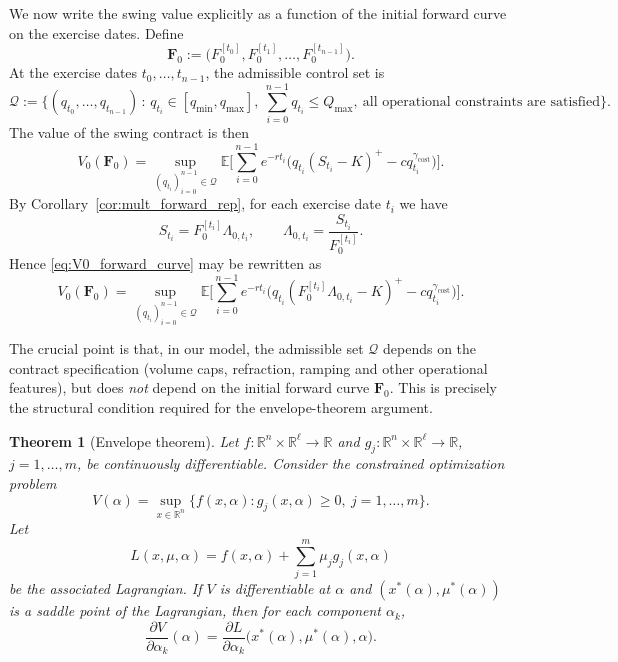 \documentclass[10pt,a4paper,reqno]{amsart}
\newcommand{\<}{\langle}
\renewcommand{\>}{\rangle}
\newtheorem{theorem}{Theorem}[section]
\theoremstyle{example}
\begin{document}
We now write the swing value explicitly as a function of the initial forward curve on the exercise dates.
Define
\[
\mathbf{F}_0
:=
\big(
F_0^{[t_0]},F_0^{[t_1]},\dots,F_0^{[t_{n-1}]}
\big).
\]
At the exercise dates $t_0,\dots,t_{n-1}$, the admissible control set is
\[
\mathcal{Q}
:=
\Bigg\{
(q_{t_0},\dots,q_{t_{n-1}})
\,:\,
q_{t_i}\in[q_{\min},q_{\max}],
\ 
\sum_{i=0}^{n-1} q_{t_i}\le Q_{\max},
\ 
\text{all operational constraints are satisfied}
\Bigg\}.
\]
The value of the swing contract is then
\begin{equation}
\label{eq:V0_forward_curve}
V_0(\mathbf{F}_0)
=
\sup_{(q_{t_i})_{i=0}^{n-1}\in\mathcal{Q}}
\mathbb{E}\!\Bigg[
\sum_{i=0}^{n-1}
e^{-r t_i}
\Big(
q_{t_i}(S_{t_i}-K)^+
-
c q_{t_i}^{\gamma_{\mathrm{cost}}}
\Big)
\Bigg].
\end{equation}
By Corollary~\ref{cor:mult_forward_rep}, for each exercise date $t_i$ we have
\begin{equation}
\label{eq:exercise_spot_forward}
S_{t_i}
=
F_0^{[t_i]} \Lambda_{0,t_i},
\qquad
\Lambda_{0,t_i}
=
\frac{S_{t_i}}{F_0^{[t_i]}}.
\end{equation}
Hence \eqref{eq:V0_forward_curve} may be rewritten as
\begin{equation}
\label{eq:V0_forward_curve_explicit}
V_0(\mathbf{F}_0)
=
\sup_{(q_{t_i})_{i=0}^{n-1}\in\mathcal{Q}}
\mathbb{E}\!\Bigg[
\sum_{i=0}^{n-1}
e^{-r t_i}
\Big(
q_{t_i}(F_0^{[t_i]}\Lambda_{0,t_i}-K)^+
-
c q_{t_i}^{\gamma_{\mathrm{cost}}}
\Big)
\Bigg].
\end{equation}

The crucial point is that, in our model, the admissible set $\mathcal{Q}$ depends on the contract
specification (volume caps, refraction, ramping and other operational features), but does \emph{not}
depend on the initial forward curve $\mathbf{F}_0$. This is precisely the structural condition required for
the envelope-theorem argument.

\begin{theorem}[Envelope theorem]
\label{thm:envelope_general}
Let $f:\mathbb{R}^n\times\mathbb{R}^{\ell}\to\mathbb{R}$ and
$g_j:\mathbb{R}^n\times\mathbb{R}^{\ell}\to\mathbb{R}$, $j=1,\dots,m$, be continuously differentiable.
Consider the constrained optimization problem
\[
V(\alpha)
=
\sup_{x\in\mathbb{R}^n}
\big\{
f(x,\alpha): g_j(x,\alpha)\ge 0,\ j=1,\dots,m
\big\}.
\]
Let
\[
L(x,\mu,\alpha)
=
f(x,\alpha)+\sum_{j=1}^m \mu_j g_j(x,\alpha)
\]
be the associated Lagrangian. If $V$ is differentiable at $\alpha$ and $(x^*(\alpha),\mu^*(\alpha))$
is a saddle point of the Lagrangian, then for each component $\alpha_k$,
\[
\frac{\partial V}{\partial \alpha_k}(\alpha)
=
\frac{\partial L}{\partial \alpha_k}\big(x^*(\alpha),\mu^*(\alpha),\alpha\big).
\]
\end{theorem}
\end{document}
